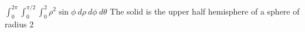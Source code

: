 {$\int_{0}^{2\pi} \int_{0}^{\pi/2} \int_{0}^{2} \rho^2 \sin\phi \: d\rho \: d\phi \: d\theta$
}
{The solid is the upper half hemisphere of a sphere of radius $2$}